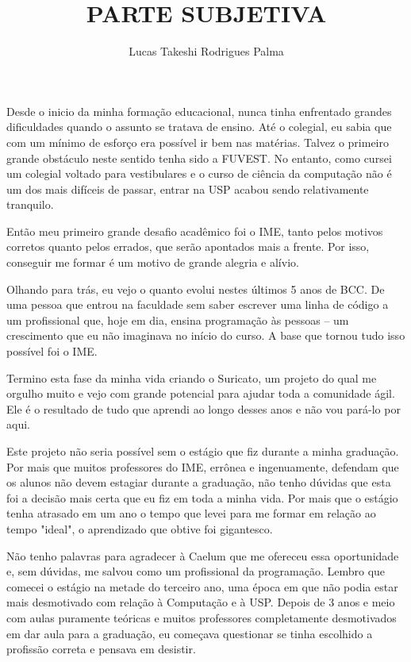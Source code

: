 \documentclass[titlepage,a4paper]{article}
\title{PARTE SUBJETIVA}
\author{Lucas Takeshi Rodrigues Palma}
\newcommand{\suricato}{Suricato}
\begin{document}
\maketitle

Desde o inicio da minha formação educacional, nunca tinha enfrentado grandes dificuldades quando o assunto se tratava de ensino. Até o colegial, eu sabia que com um mínimo de esforço era possível ir bem nas matérias. Talvez o primeiro grande obstáculo neste sentido tenha sido a FUVEST. No entanto, como cursei um colegial voltado para vestibulares e o curso de ciência da computação não é um dos mais difíceis de passar, entrar na USP acabou sendo relativamente tranquilo.

Então meu primeiro grande desafio acadêmico foi o IME, tanto pelos motivos corretos quanto pelos errados, que serão apontados mais a frente. Por isso, conseguir me formar é um motivo de grande alegria e alívio.

Olhando para trás, eu vejo o quanto evolui nestes últimos 5 anos de BCC. De uma pessoa que entrou na faculdade sem saber escrever uma linha de código a um profissional que, hoje em dia, ensina programação às pessoas -- um crescimento que eu não imaginava no início do curso. A base que tornou tudo isso possível foi o IME.

Termino esta fase da minha vida criando o \suricato{}, um projeto do qual me orgulho muito e vejo com grande potencial para ajudar toda a comunidade ágil. Ele é o resultado de tudo que aprendi ao longo desses anos e não vou pará-lo por aqui.

Este projeto não seria possível sem o estágio que fiz durante a minha graduação. Por mais que muitos professores do IME, errônea e ingenuamente, defendam que os alunos não devem estagiar durante a graduação, não tenho dúvidas que esta foi a decisão mais certa que eu fiz em toda a minha vida. Por mais que o estágio tenha atrasado em um ano o tempo que levei para me formar em relação ao tempo "ideal", o aprendizado que obtive foi gigantesco.

Não tenho palavras para agradecer à Caelum que me ofereceu essa oportunidade e, sem dúvidas, me salvou como um profissional da programação. Lembro que comecei o estágio na metade do terceiro ano, uma época em que não podia estar mais desmotivado com relação à Computação e à USP. Depois de 3 anos e meio com aulas puramente teóricas e muitos professores completamente desmotivados em dar aula para a graduação, eu começava questionar se tinha escolhido a profissão correta e pensava em desistir.
\end{document}
